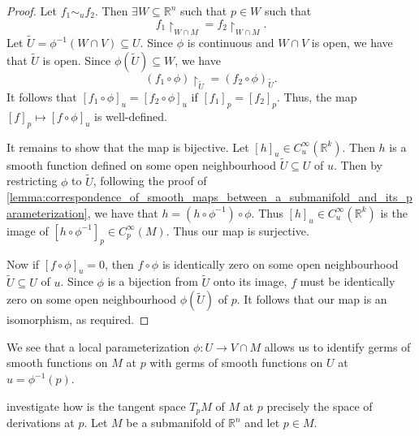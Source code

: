 \documentclass[notoc,notitlepage]{tufte-book}
\begin{document}
\begin{proof}
  Let $f_1 \sim_u f_2$. Then $\exists W \subseteq \mathbb{R}^n$ such that $p \in
  W$ such that
  \begin{equation*}
    f_1 \restriction_{W \cap M} = f_2 \restriction_{W \cap M}.
  \end{equation*}
  Let $\tilde{U} = \phi^{-1}(W \cap V) \subseteq U$. Since $\phi$ is continuous
  and $W \cap V$ is open, we have that $\tilde{U}$ is open. Since
  $\phi(\tilde{U}) \subseteq W$, we have
  \begin{equation*}
    (f_1 \circ \phi) \restriction_{\tilde{U}} = (f_2 \circ \phi)_{\tilde{U}}.
  \end{equation*}
  It follows that $[ f_1 \circ \phi ]_u = [ f_2 \circ \phi ]_u$ if $[ f_1 ]_p =
  [ f_2 ]_p$. Thus, the map $[f]_p \mapsto [f \circ \phi]_u$ is well-defined.

  It remains to show that the map is bijective. Let $[h]_u \in
  C_u^\infty(\mathbb{R}^k)$. Then $h$ is a smooth function defined on some open
  neighbourhood $\tilde{U} \subseteq U$ of $u$. Then by restricting $\phi$ to
  $\tilde{U}$, following the proof of
  \cref{lemma:correspondence_of_smooth_maps_between_a_submanifold_and_its_parameterization},
  we have that $h = (h \circ \phi^{-1}) \circ \phi$. Thus $[h]_u \in
  C_u^\infty(\mathbb{R}^k)$ is the image of $[ h \circ \phi^{-1} ]_p \in
  C_p^\infty(M)$. Thus our map is surjective.

  Now if $[ f \circ \phi ]_u = 0$, then $f \circ \phi$ is identically zero on
  some open neighbourhood $\tilde{U} \subseteq U$ of $u$. Since $\phi$ is a
  bijection from $\tilde{U}$ onto its image, $f$ must be identically zero on
  some open neighbourhood $\phi(\tilde{U})$ of $p$. It follows that our map is
  an isomorphism, as required.
\end{proof}

\begin{note}
  We see that a local parameterization $\phi : U \to V \cap M$ allows us to
  identify germs of smooth functions on $M$ at $p$ with germs of smooth
  functions on $U$ at $u = \phi^{-1}(p)$.
\end{note}

 investigate how is the tangent space $T_p M$ of $M$ at
$p$ precisely the space of derivations at $p$. Let $M$ be a submanifold of
$\mathbb{R}^n$ and let $p \in M$.
\end{document}
